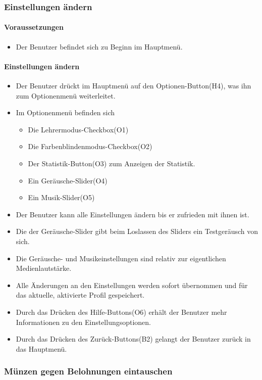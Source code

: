 \subsubsection{Einstellungen ändern}
\paragraph{Voraussetzungen}
\begin{itemize}
	\item Der Benutzer befindet sich zu Beginn im Hauptmenü.
\end{itemize}
\paragraph{Einstellungen ändern}
\begin{itemize}
	\item Der Benutzer drückt im Hauptmenü auf den Optionen-Button(H4), was ihn zum Optionenmenü weiterleitet.
	\item Im Optionenmenü befinden sich
	\begin{itemize}
		\item Die Lehrermodus-Checkbox(O1)
		\item Die Farbenblindenmodus-Checkbox(O2)
		\item Der Statistik-Button(O3) zum Anzeigen der Statistik.
		\item Ein Geräusche-Slider(O4)
		\item Ein Musik-Slider(O5)
	\end{itemize}
	\item Der Benutzer kann alle Einstellungen ändern bis er zufrieden mit ihnen ist.
	\item Die der Geräusche-Slider gibt beim Loslassen des Sliders ein Testgeräusch von sich.
	\item Die Geräusche- und Musikeinstellungen sind relativ zur eigentlichen Medienlautstärke.
	\item Alle Änderungen an den Einstellungen werden sofort übernommen und für das aktuelle, aktivierte Profil gespeichert.
	\item Durch das Drücken des Hilfe-Buttons(O6) erhält der Benutzer mehr Informationen zu den Einstellungsoptionen.
	\item Durch das Drücken des Zurück-Buttons(B2) gelangt der Benutzer zurück in das Hauptmenü.
\end{itemize}

\subsubsection{Münzen gegen Belohnungen eintauschen}
